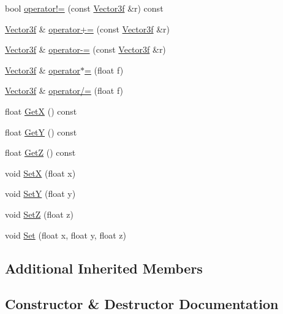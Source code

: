 \begin{DoxyCompactItemize}
\item 
bool \hyperlink{class_vector3f_ab41ff6fe5ca06f605499dfa7668c3eb8}{operator!=} (const \hyperlink{class_vector3f}{Vector3f} \&r) const 
\item 
\hyperlink{class_vector3f}{Vector3f} \& \hyperlink{class_vector3f_abb9089cd5b410ea28b1d1db63fc550f8}{operator+=} (const \hyperlink{class_vector3f}{Vector3f} \&r)
\item 
\hyperlink{class_vector3f}{Vector3f} \& \hyperlink{class_vector3f_a63ec561fd67ea011aa973c0549d48a26}{operator-\/=} (const \hyperlink{class_vector3f}{Vector3f} \&r)
\item 
\hyperlink{class_vector3f}{Vector3f} \& \hyperlink{class_vector3f_a0449c07194a079d3eb57961e374e96ee}{operator$\ast$=} (float f)
\item 
\hyperlink{class_vector3f}{Vector3f} \& \hyperlink{class_vector3f_a7586bd129a4aa5326d4663323760958f}{operator/=} (float f)
\item 
float \hyperlink{class_vector3f_af5a97e51e8e1db09c7381a9d15e8f176}{Get\+X} () const 
\item 
float \hyperlink{class_vector3f_a468098deabbe5e8bef23e555a974b3af}{Get\+Y} () const 
\item 
float \hyperlink{class_vector3f_a5e6d015d4cf9fa85eeb51e0e53225d84}{Get\+Z} () const 
\item 
void \hyperlink{class_vector3f_aaa6791fa256647707bcf41017f498bcf}{Set\+X} (float x)
\item 
void \hyperlink{class_vector3f_a260bcd7eb6bebb43f79a29421d254f2b}{Set\+Y} (float y)
\item 
void \hyperlink{class_vector3f_afb24d616af2e75cce9af632c870141ac}{Set\+Z} (float z)
\item 
void \hyperlink{class_vector3f_abbbcad97c6edc42ad313482fbb4eb3dd}{Set} (float x, float y, float z)
\end{DoxyCompactItemize}
\subsection*{Additional Inherited Members}


\subsection{Constructor \& Destructor Documentation}
\hypertarget{class_vector3f_a83ea28e272c27ddaa8c0d2c703850bcb}{}
